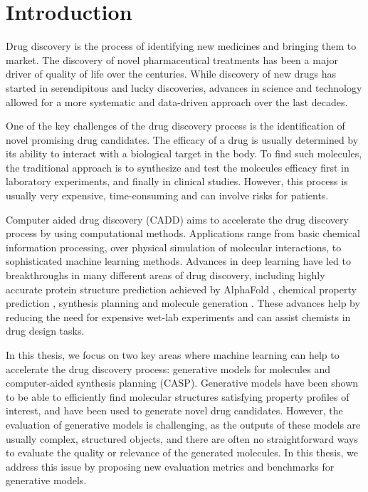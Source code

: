 \chapter{Introduction\label{chap:introduction}}
Drug discovery is the process of identifying new medicines and bringing them to
market. The discovery of novel pharmaceutical treatments has been a major driver
of quality of life over the centuries. While discovery of new drugs has started 
in serendipitous and lucky discoveries, advances in science and technology  
allowed for a more systematic and data-driven approach over the last decades. 

One of the key challenges of the drug discovery process is the identification
of novel promising drug candidates. The efficacy of a drug is usually determined by its ability
to interact with a biological target in the body. To find such molecules,
the traditional approach is to synthesize and test the molecules efficacy first in laboratory
experiments, and finally in clinical studies. However, this process is usually very expensive, time-consuming
and can involve risks for patients.

Computer aided drug discovery (CADD) aims to accelerate the drug discovery
process by using computational methods. Applications range from basic chemical
information processing, over physical simulation of molecular interactions, to
sophisticated machine learning methods. Advances in deep learning
\citep{chenRiseDeepLearning2018} have led to breakthroughs in many different
areas of drug discovery, including highly accurate protein structure prediction 
achieved by AlphaFold \citep{todo}, chemical property prediction
\citep{mayrDeepToxToxicityPrediction2016,todo}, synthesis planning
\citep{seglerNeuralSymbolicMachineLearning2017} and molecule generation
\citep{todo}. These advances help by reducing the need for expensive 
wet-lab experiments and can assist chemists in drug design tasks. 

In this thesis, we focus on two key areas where machine learning can help to
accelerate the drug discovery process: generative models for molecules and
computer-aided synthesis planning (CASP). Generative models have been shown to
be able to efficiently find molecular structures satisfying property profiles of
interest, and have been used to generate novel drug candidates. However, the
evaluation of generative models is challenging, as the outputs of these models
are usually complex, structured objects, and there are often no straightforward
ways to evaluate the quality or relevance of the generated molecules. In this
thesis, we address this issue by proposing new evaluation metrics and benchmarks
for generative models.

